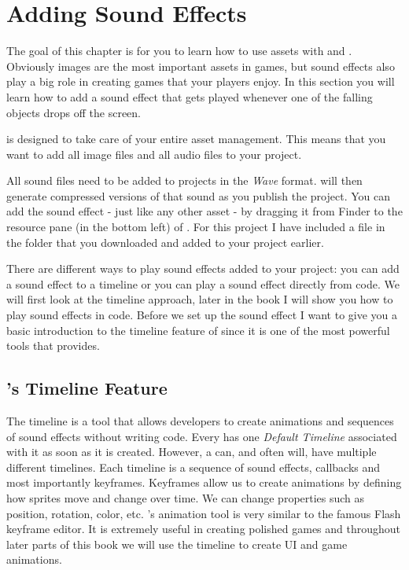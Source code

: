 \section{Adding Sound Effects}
The goal of this chapter is for you to learn how to use assets with \SB{} and
\cocos{}. Obviously images are the most important assets in games, but sound
effects also play a big role in creating games that your players enjoy. In this
section you will learn how to add a sound effect that gets played whenever one
of the falling objects drops off the screen.

\SB{} is designed to take care of your entire asset management. This means that
you want to add all image files and all audio files to your \SB{} project.

All sound files need to be added to \SB{} projects in the \textit{Wave}
format. \SB{} will then generate compressed versions of that sound as you
publish the project. You can add the sound effect - just like any other asset -
by dragging it from Finder to the resource pane (in the bottom left) of \SB{}. For this project I have included a 
file in the  folder that you downloaded and added to your
project earlier.

There are different ways to play sound effects added to your \SB{} project: you
can add a sound effect to a \SB{} timeline or you can play a sound effect
directly from code. We will first look at the timeline approach, later in the
book I will show you how to play sound effects in code.
Before we set up the sound effect I want to give you a basic introduction to the timeline feature
of \SB{} since it is one of the most powerful tools that \SB{} provides.

\subsection{\SB{}'s Timeline Feature}
The \SB{} timeline is a tool that allows developers to create animations and
sequences of sound effects without writing code. Every \ccbfile{} has one
\textit{Default Timeline} associated with it as soon as it is created. However,
a \ccbfile{} can, and often will, have multiple different timelines. Each
timeline is a sequence of sound effects, callbacks and most importantly
keyframes. Keyframes allow us to create animations by defining how sprites move
and change over time. We can change properties such as position, rotation,
color, etc. \SB{}'s animation tool is very similar to the famous Flash keyframe
editor. It is extremely useful in creating polished games and throughout later
parts of this book we will use the \SB{} timeline to create UI and game
animations.

